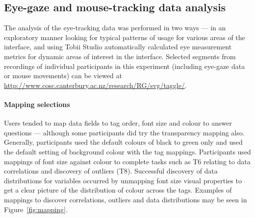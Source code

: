 \subsection{Eye-gaze and mouse-tracking data analysis} \label{subsect:eyegaze3}

The analysis of the eye-tracking data was performed in two ways --- in an exploratory manner looking for typical patterns of usage for various areas of the interface, and using Tobii Studio automatically calculated eye measurement metrics for dynamic areas of interest in the interface. Selected segments from recordings of individual participants in this experiment (including eye-gaze data or mouse movements) can be viewed at \url{http://www.cosc.canterbury.ac.nz/research/RG/svg/taggle/}.

\paragraph{Mapping selections}

Users tended to map data fields to tag order, font size and colour to answer questions --- although some participants did try the transparency mapping also. Generally, participants used the default colours of black to green only and used the default setting of background colour with the tag mappings. Participants used mappings of font size against colour to complete tasks such as T6 relating to data correlations and discovery of outliers (T8). Successful discovery of data distributions for variables occurred by unmapping font size visual properties to get a clear picture of the distribution of colour across the tags. Examples of mappings to discover correlations, outliers and data distributions may be seen in Figure~\vref{fig:mapping}.

